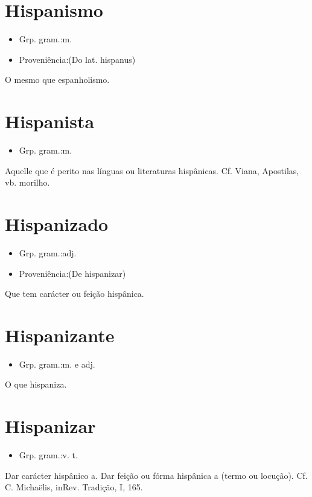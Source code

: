 \documentclass{article}
\begin{document}
\section{Hispanismo}
\begin{itemize}
\item {Grp. gram.:m.}
\end{itemize}
\begin{itemize}
\item {Proveniência:(Do lat. \textunderscore hispanus\textunderscore )}
\end{itemize}
O mesmo que \textunderscore espanholismo\textunderscore .
\section{Hispanista}
\begin{itemize}
\item {Grp. gram.:m.}
\end{itemize}
Aquelle que é perito nas línguas ou literaturas hispânicas. Cf. Viana, \textunderscore Apostilas\textunderscore , vb. \textunderscore morilho\textunderscore .
\section{Hispanizado}
\begin{itemize}
\item {Grp. gram.:adj.}
\end{itemize}
\begin{itemize}
\item {Proveniência:(De \textunderscore hispanizar\textunderscore )}
\end{itemize}
Que tem carácter ou feição hispânica.
\section{Hispanizante}
\begin{itemize}
\item {Grp. gram.:m.  e  adj.}
\end{itemize}
O que hispaniza.
\section{Hispanizar}
\begin{itemize}
\item {Grp. gram.:v. t.}
\end{itemize}
Dar carácter hispânico a.
Dar feição ou fórma hispânica a (termo ou locução). Cf. C. Michaëlis, \textunderscore in\textunderscore  Rev. \textunderscore Tradição\textunderscore , I, 165.
\end{document}
